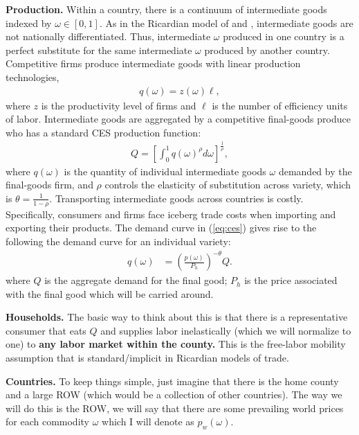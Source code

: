 \documentclass[pdftex,12pt]{article}
\begin{document}
\medskip
\noindent \textbf{Production.} Within a country, there is a continuum of intermediate goods indexed by $\omega \in [0, 1]$. As in the Ricardian model of \citet{dornbusch1977comparative} and \citet{eaton2002technology}, intermediate goods are not nationally differentiated. Thus, intermediate $\omega$ produced in one country is a perfect substitute for the same intermediate $\omega$ produced by another country. Competitive firms produce intermediate goods with linear production technologies,
\begin{align}
q(\omega) = z(\omega) \ell,
\end{align}
where $z$ is the productivity level of firms and $\ell$ is the number of efficiency units of labor. Intermediate goods are aggregated by a competitive final-goods produce who has a standard CES production function:
\begin{align}
Q = \left[ \int_0^1 q(\omega)^\rho d\omega \right]^{\frac{1}{\rho}},
\label{eq:ces}
\end{align}
where $q(\omega)$ is the quantity of individual intermediate goods $\omega$ demanded by the final-goods firm, and $\rho$ controls the elasticity of substitution across variety, which is $\theta = \frac{1}{1-\rho}$. Transporting intermediate goods across countries is costly. Specifically, consumers and firms face iceberg trade costs when importing and exporting their products. The demand curve in (\ref{eq:ces}) gives rise to the following the demand curve for an individual variety:
\begin{align}
q(\omega) & = \left(\frac{p(\omega)}{P_h}\right)^{-\theta}Q.
\label{eq:demand_curve}
\end{align}
where $Q$ is the aggregate demand for the final good; $P_h$ is the price associated with the final good which will be carried around.

\medskip
\noindent \textbf{Households.} The basic way to think about this is that there is a representative consumer that eats $Q$ and supplies labor inelastically (which we will normalize to one) to \textbf{any labor market within the county.} This is the free-labor mobility assumption that is standard/implicit in Ricardian models of trade.

\medskip
\noindent \textbf{Countries.} To keep things simple, just imagine that there is the home county and a large ROW (which would be a collection of other countries). The way we will do this is the ROW, we will say that there are some prevailing world prices for each commodity $\omega$ which I will denote as $p_w(\omega)$.
\end{document}
